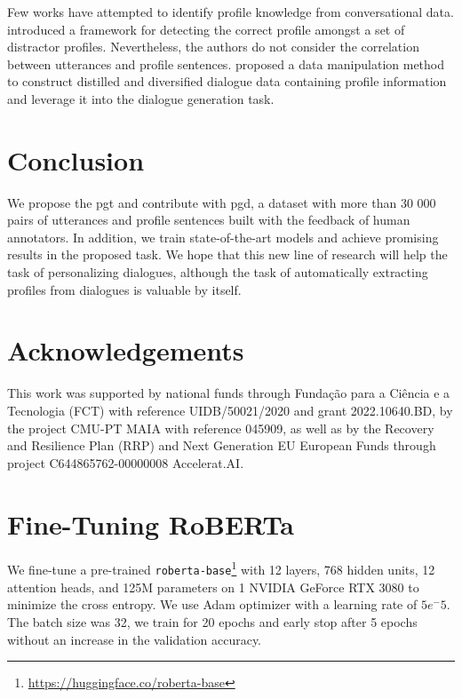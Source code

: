 \documentclass[11pt]{article}
\begin{document}
Few works have attempted to identify profile knowledge from conversational data.
\cite{DETECT-SPEAKER} introduced a framework for detecting the correct profile amongst a set of distractor profiles.
Nevertheless, the authors do not consider the correlation between utterances and profile sentences.
\cite{DATA-MANIPULATION-PERSONA} proposed a data manipulation method to construct distilled and diversified dialogue data containing profile information and leverage it into the dialogue generation task.

\section{Conclusion}

We propose the \gls*{pgt} and contribute with \gls*{pgd}, a dataset with more than 30 000 pairs of utterances and profile sentences built with the feedback of human annotators. In addition, we train state-of-the-art models and achieve promising results in the proposed task. We hope that this new line of research will help the task of personalizing dialogues, although the task of automatically extracting profiles from dialogues is valuable by itself. 

\section*{Acknowledgements}
This work was supported by national funds through Fundação para a Ciência e a Tecnologia (FCT) with reference UIDB/50021/2020 and grant 2022.10640.BD, by the project CMU-PT MAIA with reference 045909, as well as by the Recovery and Resilience Plan (RRP) and Next Generation EU European Funds through project C644865762-00000008 Accelerat.AI.













\clearpage

\appendix

\section{Fine-Tuning RoBERTa}
\label{appendix:roberta-dnli}

We fine-tune a pre-trained \texttt{roberta-base}\footnote{\href{https://huggingface.co/roberta-base}{https://huggingface.co/roberta-base}} \cite{ROBERTA} with 12 layers, 768 hidden units, 12 attention heads, and 125M parameters on 1 NVIDIA GeForce RTX 3080 to minimize the cross entropy. We use Adam \cite{ADAM} optimizer with a learning rate of \(5e^-5\).
The batch size was 32, we train for 20 epochs and early stop after 5 epochs without an increase in the validation accuracy.
\end{document}
